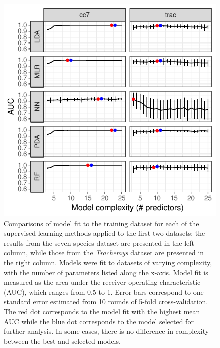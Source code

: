 \documentclass[12pt,letterpaper]{article}
\begin{document}
\begin{figure}[ht]
  \centering
  \includegraphics[height = \textheight, width = \textwidth, keepaspectratio = true]{figure/other_model_sel}
  \caption{Comparisons of model fit to the training dataset for each of the supervised learning methods applied to the first two datasets; the results from the seven species dataset are presented in the left column, while those from the \textit{Trachemys} dataset are presented in the right column. Models were fit to datasets of varying complexity, with the number of parameters listed along the x-axis. Model fit is measured as the area under the receiver operating characteristic (AUC), which ranges from 0.5 to 1. Error bars correspond to one standard error estimated from 10 rounds of 5-fold cross-validation. The red dot corresponds to the model fit with the highest mean AUC while the blue dot corresponds to the model selected for further analysis. In some cases, there is no difference in complexity between the best and selected models.}
  \label{fig:other_sel}
\end{figure}
\end{document}
